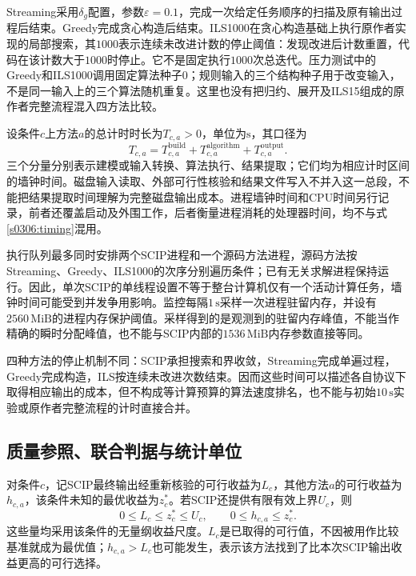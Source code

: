 Streaming采用$\delta_g$配置，参数$\varepsilon=0.1$，完成一次给定任务顺序的扫描及原有输出过程后结束\cite{ReinstadtlerFPU2025}。Greedy完成贪心构造后结束。ILS1000在贪心构造基础上执行原作者实现的局部搜索，其$1000$表示连续未改进计数的停止阈值：发现改进后计数重置，代码在该计数大于$1000$时停止\cite{GrossmannJRS2026}。它不是固定执行$1000$次总迭代。压力测试中的Greedy和ILS1000调用固定算法种子$0$；规则输入的三个结构种子用于改变输入，不是同一输入上的三个算法随机重复。这里也没有把归约、展开及ILS15组成的原作者完整流程混入四方法比较。

设条件$c$上方法$a$的总计时时长为$T_{c,a}>0$，单位为$\mathrm{s}$，其口径为
\begin{equation}
 T_{c,a}=T_{c,a}^{\mathrm{build}}
       +T_{c,a}^{\mathrm{algorithm}}
       +T_{c,a}^{\mathrm{output}}.
 \label{s0306:timing}
\end{equation}
三个分量分别表示建模或输入转换、算法执行、结果提取；它们均为相应计时区间的墙钟时间。磁盘输入读取、外部可行性核验和结果文件写入不并入这一总段，不能把结果提取时间理解为完整磁盘输出成本。进程墙钟时间和CPU时间另行记录，前者还覆盖启动及外围工作，后者衡量进程消耗的处理器时间，均不与式\eqref{s0306:timing}混用。

执行队列最多同时安排两个SCIP进程和一个源码方法进程，源码方法按Streaming、Greedy、ILS1000的次序分别遍历条件；已有无关求解进程保持运行。因此，单次SCIP的单线程设置不等于整台计算机仅有一个活动计算任务，墙钟时间可能受到并发争用影响。监控每隔$1\,\mathrm{s}$采样一次进程驻留内存，并设有$2560\,\mathrm{MiB}$的进程内存保护阈值。采样得到的是观测到的驻留内存峰值，不能当作精确的瞬时分配峰值，也不能与SCIP内部的$1536\,\mathrm{MiB}$内存参数直接等同。

四种方法的停止机制不同：SCIP承担搜索和界收敛，Streaming完成单遍过程，Greedy完成构造，ILS按连续未改进次数结束。因而这些时间可以描述各自协议下取得相应输出的成本，但不构成等计算预算的算法速度排名，也不能与初始$10\,\mathrm{s}$实验或原作者完整流程的计时直接合并。

\subsection{质量参照、联合判据与统计单位}

对条件$c$，记SCIP最终输出经重新核验的可行收益为$L_c$，其他方法$a$的可行收益为$h_{c,a}$，该条件未知的最优收益为$z_c^*$。若SCIP还提供有限有效上界$U_c$，则
\begin{equation}
 0\leq L_c\leq z_c^*\leq U_c,
 \qquad 0\leq h_{c,a}\leq z_c^*.
 \label{s0306:bounds}
\end{equation}
这些量均采用该条件的无量纲收益尺度。$L_c$是已取得的可行值，不因被用作比较基准就成为最优值；$h_{c,a}>L_c$也可能发生，表示该方法找到了比本次SCIP输出收益更高的可行选择。

